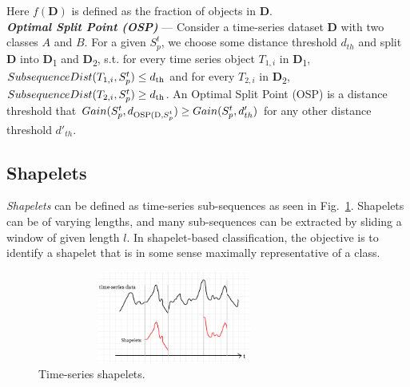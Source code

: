 \documentclass[conference]{IEEEtran}  %
\begin{document}
Here $f(\textbf{D})$ is defined as the fraction of objects in \textbf{D}. 
\smallskip\\
\textbf{\textit{Optimal Split Point (OSP)}} --- Consider a time-series dataset \textbf{D} with two classes $A$ and $B$. For a given $S^t_p$, we choose some distance threshold $d_{th}$ and split \textbf{D} into \textbf{D}\textsubscript{1} and \textbf{D}\textsubscript{2}, s.t. for every time series object $T_{1,i}$ in \textbf{D}\textsubscript{1}, \(SubsequenceDist(T_{1,i}, S^t_p) \leq d\textsubscript{th}\) and for every $T_{2,i}$ in \textbf{D}\textsubscript{2}, \(SubsequenceDist(T_{2,i}, S^t_p) \geq d\textsubscript{th}\). An Optimal Split Point (OSP) is a distance threshold that \( Gain(S^t_p,d\textsubscript{OSP(D,$S^t_p$}) \geq Gain(S^t_p,d'_{th}) \) for any other distance threshold $d'_{th}$.
\subsection{Shapelets}
\textit{Shapelets} can be defined as time-series sub-sequences as seen in Fig.~\ref{fig:shapelets}. 
Shapelets can be of varying lengths, and many sub-sequences can be extracted by sliding a window of given length $l$. In shapelet-based classification, the objective is to identify a shapelet that is in some sense maximally representative of a class.

\begin{figure}
\includegraphics[width=9cm,height=3cm]{shapelet1.png}
\caption{Time-series shapelets.}
\label{fig:shapelets}
\end{figure}
\end{document}
